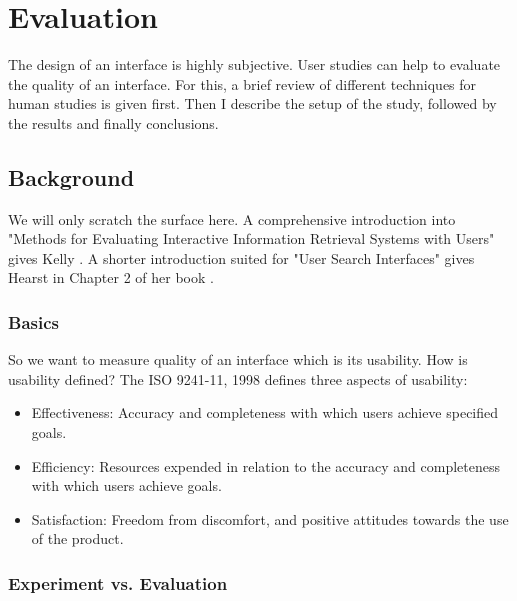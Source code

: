 \documentclass[11pt]{report}
\begin{document}
\chapter{Evaluation}
\label{Evaluation}

The design of an interface is highly subjective. User studies can help to evaluate the quality of an interface. For this, a brief review of different techniques for human studies is given first. Then I describe the setup of the study, followed by the results and finally conclusions.

\section{Background}

We will only scratch the surface here. A comprehensive introduction into "Methods for Evaluating Interactive Information Retrieval Systems with Users" gives Kelly \cite{Kelly2007}. A shorter introduction suited for "User Search Interfaces" gives Hearst in Chapter 2 of her book \cite{Hearst2009}.

\subsection{Basics}

So we want to measure quality of an interface which is its usability. How is usability defined? The ISO 9241-11, 1998 \cite{ISO} defines three aspects of usability:
\begin{itemize}
	\item Effectiveness: Accuracy and completeness with which users achieve specified goals.
	\item Efficiency: Resources expended in relation to the accuracy and completeness with which users achieve goals.
	\item Satisfaction: Freedom from discomfort, and positive attitudes towards the use of the product.
\end{itemize}

\subsection{Experiment vs. Evaluation}
\end{document}
